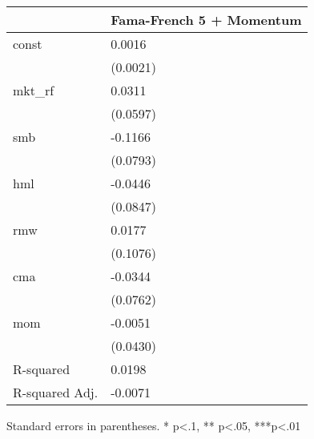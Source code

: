 \begin{table}
\caption{}
\label{}
\begin{center}
\begin{tabular}{ll}
\hline
               & Fama-French 5 + Momentum  \\
\hline
const          & 0.0016                    \\
               & (0.0021)                  \\
mkt\_rf        & 0.0311                    \\
               & (0.0597)                  \\
smb            & -0.1166                   \\
               & (0.0793)                  \\
hml            & -0.0446                   \\
               & (0.0847)                  \\
rmw            & 0.0177                    \\
               & (0.1076)                  \\
cma            & -0.0344                   \\
               & (0.0762)                  \\
mom            & -0.0051                   \\
               & (0.0430)                  \\
R-squared      & 0.0198                    \\
R-squared Adj. & -0.0071                   \\
\hline
\end{tabular}
\end{center}
\end{table}
\bigskip
Standard errors in parentheses. \newline 
* p<.1, ** p<.05, ***p<.01